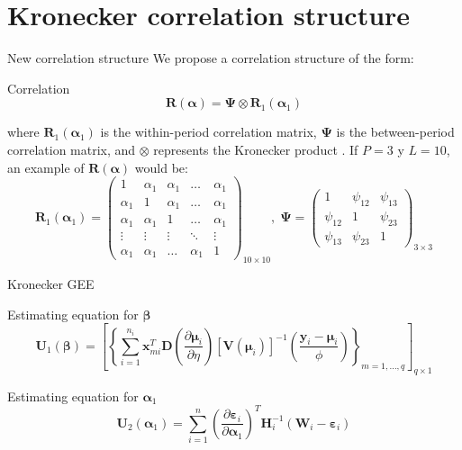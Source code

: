 \documentclass[t,9pt]{beamer}
\begin{document}
\section{Kronecker correlation structure}
\begin{frame}[fragile]{New correlation structure}
We propose a correlation structure of the form:
 \begin{block}{Correlation }
\begin{equation}\nonumber
    \pmb{R}(\pmb{\alpha})=\pmb{\Psi}\otimes\pmb{R}_1(\pmb{\alpha}_1)
\end{equation}
 \end{block} 
 where $\pmb{R}_1(\pmb{\alpha}_1)$  is the within-period correlation matrix, $\pmb{\Psi}$ is the between-period correlation matrix, and $\otimes$ represents the Kronecker product \citep{harville}. If $P=3$ y $L=10$, an example of $\pmb{R}(\pmb{\alpha})$ would be:
\begin{equation}\nonumber
    \pmb{R}_1(\pmb{\alpha}_1) = \begin{pmatrix}
     1 & \alpha_1 & \alpha_1&\ldots & \alpha_1\\
     \alpha_1 & 1 & \alpha_1 &\ldots & \alpha_1\\
     \alpha_1 & \alpha_1 & 1 &\ldots & \alpha_1\\
     \vdots & \vdots & \vdots & \ddots & \vdots\\
     \alpha_1 & \alpha_1 & \ldots &\alpha_1 & 1
    \end{pmatrix}_{10\times 10}, \; \pmb{\Psi}=\begin{pmatrix}
     1 & \psi_{12} & \psi_{13}\\
     \psi_{12} & 1  & \psi_{23}\\
     \psi_{13} &\psi_{23} & 1
    \end{pmatrix}_{3\times 3}
\end{equation}
\end{frame}
\begin{frame}[fragile]{Kronecker GEE}
 \begin{block}{Estimating equation for $\pmb{\beta}$}
     \begin{equation}\nonumber
        \pmb{U}_1(\pmb{\beta})=\left[ \left\{\sum_{i=1}^{n_i} \pmb{x}_{mi}^T \pmb{D}\left( \frac{\partial \pmb{\mu}_i}{\partial\eta}\right) [\pmb{V}(\pmb{\mu}_i)]^{-1}\left(\frac{\pmb{y}_{i}- \pmb{\mu}_i}{\phi} \right) \right\}_{m=1, \ldots, q} \right]_{q\times 1} 
     \end{equation}
 \end{block}
 \begin{block}{Estimating equation for $\pmb{\alpha}_1$}
     \begin{equation}\nonumber
        \pmb{U}_2(\pmb{ \alpha}_1)=\sum_{i=1}^n \left(\frac{\partial \pmb{\varepsilon}_{i}}{\partial \pmb{ \alpha}_1} \right)^T \pmb{H}_{i}^{-1} \left(\pmb{W}_{i} - \pmb{\varepsilon}_{i} \right)
     \end{equation}
 \end{block}
 \end{frame}
\end{document}
